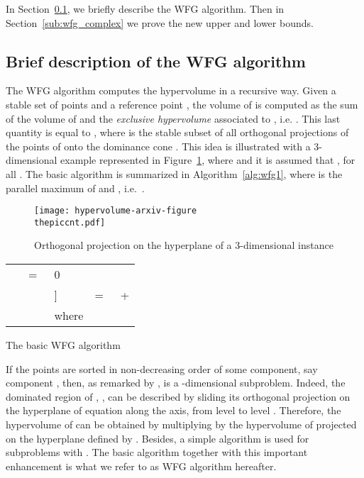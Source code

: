 \documentclass[a4paper,11pt]{article}
\newcounter{piccnt}
\begin{document}
In Section~\ref{sub:wfg}, we briefly describe the WFG algorithm. 
Then in Section~\ref{sub:wfg_complex} we prove the new upper and lower bounds.

\subsection{Brief description of the WFG algorithm}\label{sub:wfg}

The WFG algorithm computes the hypervolume in a recursive way.
Given a stable set  of points and a reference point ,
the volume of  is computed as the sum of the volume of 
and the \emph{exclusive hypervolume} associated to , i.e.
.
This last quantity is equal to , 
where  is the stable subset of all orthogonal projections of the points of  onto the dominance cone
.
This idea is illustrated with a 3-dimensional example represented in Figure~\ref{fig:wfg1}, 
where  and it is assumed that 
, for all .
The basic algorithm is summarized in Algorithm~\ref{alg:wfg1}, 
where  is the parallel maximum of  and , 
i.e.\  .

\begin{figure}
  \begin{center}
    \texttt{[image: hypervolume-arxiv-figure\\thepiccnt.pdf]}
  \end{center}
  
  \caption{Orthogonal projection on the hyperplane  of a 3-dimensional instance\label{fig:wfg1}}
\end{figure}



\begin{algorithm}  
  \begin{tabular}{lll}
    \WFG{}~     &  =~ & 0\; \\
    &&\-8pt]
    \WFG{}~ &  =~ &  \WFG{} + \WFG{}  \WFG{}\;\\
                            &     & where \;
  \end{tabular}\;
  \caption{The basic WFG algorithm\label{alg:wfg1}}
\end{algorithm}

If the points are sorted in non-decreasing order of some component, say component , 
then, as remarked by \citet{WhiHinBarHub06},
\WFG{} is a -dimensional subproblem. 
Indeed, the dominated region of , , 
can be described by sliding its orthogonal projection on the hyperplane
of equation  along the  axis, 
from level  to level .
Therefore, the hypervolume of  can be obtained by multiplying by 
the hypervolume of  projected on the hyperplane defined by .
Besides, a simple algorithm is used for subproblems with .
The basic algorithm together with this important enhancement 
is what we refer to as WFG algorithm hereafter.
\end{document}
